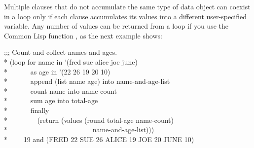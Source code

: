 Multiple clauses that do not accumulate the same type of data object 
can coexist in a loop only if each clause accumulates its values into 
a different user-specified variable.  Any number of values can
be returned from a loop if you use the Common Lisp function ,
as the next example shows:
\begin{lisp}
;;; Count and collect names and ages. \\*
(loop for name in '(fred sue alice joe june) \\*
~~~~~~as age in '(22 26 19 20 10) \\*
~~~~~~append (list name age) into name-and-age-list \\*
~~~~~~count name into name-count \\*
~~~~~~sum age into total-age \\*
~~~~~~finally \\*
~~~~~~~~(return (values (round total-age name-count) \\*
~~~~~~~~~~~~~~~~~~~~~~~~name-and-age-list))) \\*
~~~\EV~19 \textrm{and} (FRED 22 SUE 26 ALICE 19 JOE 20 JUNE 10)
\end{lisp}

